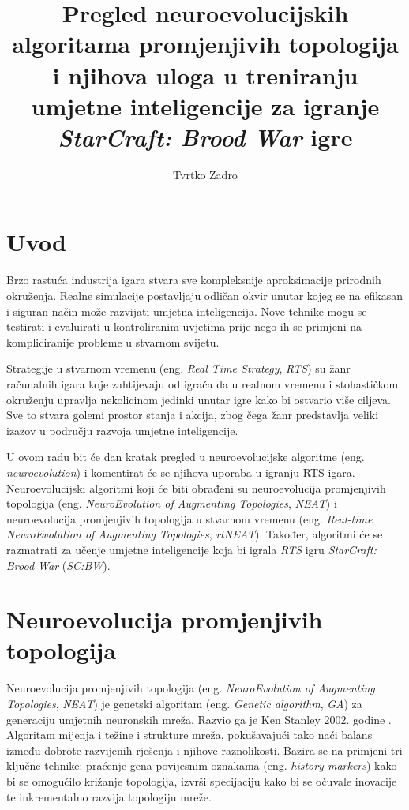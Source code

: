 \documentclass[times, utf8, seminar, numeric]{fer}
\begin{document}
\nocite{*}
\graphicspath{{slike/}}

\title{Pregled neuroevolucijskih algoritama promjenjivih topologija i njihova uloga u treniranju umjetne inteligencije za igranje \textit{StarCraft: Brood War} igre}
\author{Tvrtko Zadro}
\maketitle

\tableofcontents

\chapter{Uvod}
Brzo rastuća industrija igara stvara sve kompleksnije aproksimacije prirodnih okruženja. Realne simulacije postavljaju odličan okvir unutar kojeg se na efikasan i siguran način može razvijati umjetna inteligencija. Nove tehnike mogu se testirati i evaluirati u kontroliranim uvjetima prije nego ih se primjeni na kompliciranije probleme u stvarnom svijetu.

Strategije u stvarnom vremenu (eng. \textit{Real Time Strategy}, \textit{RTS}) su žanr računalnih igara koje zahtijevaju od igrača da u realnom vremenu i stohastičkom okruženju upravlja nekolicinom jedinki unutar igre kako bi ostvario više ciljeva. Sve to stvara golemi prostor stanja i akcija, zbog čega žanr predstavlja veliki izazov u području razvoja umjetne inteligencije.

U ovom radu bit će dan kratak pregled u neuroevolucijske algoritme (eng. \textit{neuroevolution}) i komentirat će se njihova uporaba u igranju RTS igara. Neuroevolucijski algoritmi koji će biti obrađeni su neuroevolucija promjenjivih topologija (eng. \textit{NeuroEvolution of Augmenting Topologies}, \textit{NEAT}) i neuroevolucija promjenjivih topologija u stvarnom vremenu (eng. \textit{Real-time NeuroEvolution of Augmenting Topologies}, \textit{rtNEAT}). Također, algoritmi će se razmatrati za učenje umjetne inteligencije koja bi igrala \textit{RTS} igru \textit{StarCraft: Brood War} (\textit{SC:BW}).

\chapter{Neuroevolucija promjenjivih topologija}
Neuroevolucija promjenjivih topologija (eng. \textit{NeuroEvolution of Augmenting Topologies}, \textit{NEAT}) je genetski algoritam (eng. \textit{Genetic algorithm}, \textit{GA}) za generaciju umjetnih neuronskih mreža. Razvio ga je Ken Stanley 2002. godine \citep{rad2}. Algoritam mijenja i težine i strukture mreža, pokušavajući tako naći balans između dobrote razvijenih rješenja i njihove raznolikosti. Bazira se na primjeni tri ključne tehnike: praćenje gena povijesnim oznakama (eng. \textit{history markers}) kako bi se omogućilo križanje topologija, izvrši specijaciju kako bi se očuvale inovacije te inkrementalno razvija topologiju mreže.
\end{document}
